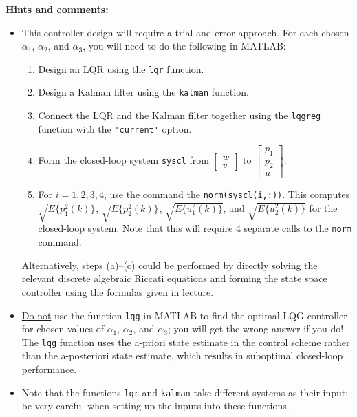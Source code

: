 \textbf{Hints and comments:}
\begin{itemize}
    \item
    This controller design will require a trial-and-error approach. For each chosen $\alpha_1$, $\alpha_2$, and $\alpha_3$, you will need to do the following in MATLAB:
    \begin{enumerate}
        \item
        Design an LQR using the \verb|lqr| function.

        \item
        Design a Kalman filter using the \verb|kalman| function.

        \item
        Connect the LQR and the Kalman filter together using the \verb|lqgreg| function with the \verb|'current'| option.

        \item
        Form the closed-loop system \verb|syscl| from $\begin{bmatrix} w \\ v \end{bmatrix}$ to $\begin{bmatrix} p_1 \\ p_2 \\ u \end{bmatrix}$.

        \item
        For $i = 1,2,3,4$, use the command the \verb|norm(syscl(i,:))|. This computes $\sqrt{ E \{ p_1^2(k) \}}$, $\sqrt{ E \{ p_2^2(k) \}}$, $\sqrt{ E \{ u_1^2(k) \}}$, and $\sqrt{ E \{ u_2^2(k) \}}$ for the closed-loop system. Note that this will require 4 separate calls to the \verb|norm| command.
    \end{enumerate}
    Alternatively, steps (a)--(c) could be performed by directly solving the relevant discrete algebraic Riccati equations and forming the state space controller using the formulas given in lecture.

    \item
    \underline{Do not} use the function \verb|lqg| in MATLAB to find the optimal LQG controller for chosen values of $\alpha_1$, $\alpha_2$, and $\alpha_3$; you will get the wrong answer if you do! The \verb|lqg| function uses the a-priori state estimate in the control scheme rather than the a-posteriori state estimate, which results in suboptimal closed-loop performance.

    \item
    Note that the functions \verb|lqr| and \verb|kalman| take different systems as their input; be very careful when setting up the inputs into these functions.


\end{itemize}
